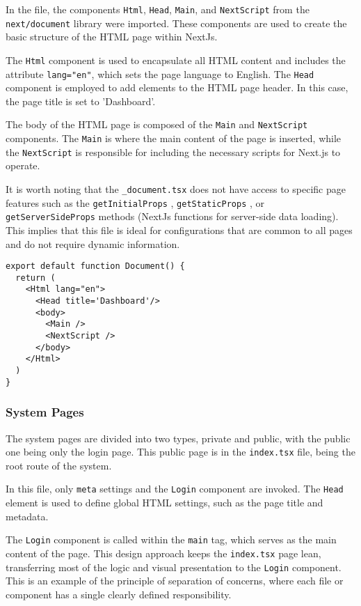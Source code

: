 In the file, the components \texttt{Html}, \texttt{Head}, \texttt{Main}, and \texttt{NextScript} from the \texttt{next/document} library were imported. These components are used to create the basic structure of the HTML page within NextJs.

The \texttt{Html} component is used to encapsulate all HTML content and includes the attribute \texttt{lang="en"}, which sets the page language to English. The \texttt{Head} component \cite{nextjsHeadComponent} is employed to add elements to the HTML page header. In this case, the page title is set to 'Dashboard'.

The body of the HTML page is composed of the \texttt{Main} and \texttt{NextScript} components. The \texttt{Main} is where the main content of the page is inserted, while the \texttt{NextScript} is responsible for including the necessary scripts for Next.js to operate.

It is worth noting that the \texttt{\_document.tsx} does not have access to specific page features such as the \texttt{getInitialProps} \cite{nextjsInitialProps}, \texttt{getStaticProps} \cite{nextjsGetStaticProps}, or \texttt{getServerSideProps} \cite{nextjsGetServerSideProps} methods (NextJs functions for server-side data loading). This implies that this file is ideal for configurations that are common to all pages and do not require dynamic information.

\begin{Verbatim}[fontsize=\small, baselinestretch=0.8]
export default function Document() {
  return (
    <Html lang="en">
      <Head title='Dashboard'/>
      <body>
        <Main />
        <NextScript />
      </body>
    </Html>
  )
}
\end{Verbatim}

\subsubsection{System Pages}\label{subsec:systemPages}
The system pages are divided into two types, private and public, with the public one being only the login page. This public page is in the \texttt{index.tsx} file, being the root route of the system.

In this file, only \texttt{meta} settings and the \texttt{Login} component are invoked. The \texttt{Head} element \cite{nextjsHeadComponent} is used to define global HTML settings, such as the page title and metadata.

The \texttt{Login} component is called within the \texttt{main} tag, which serves as the main content of the page. This design approach keeps the \texttt{index.tsx} page lean, transferring most of the logic and visual presentation to the \texttt{Login} component. This is an example of the principle of separation of concerns, where each file or component has a single clearly defined responsibility.

